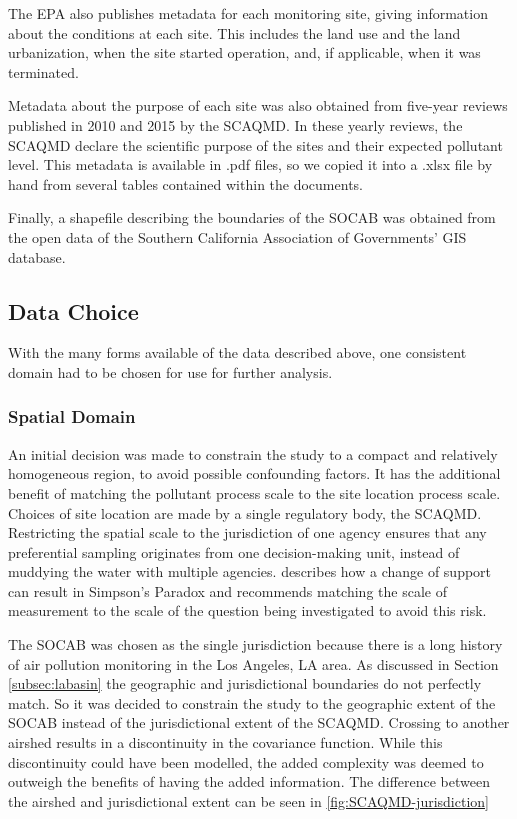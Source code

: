 \documentclass{article}
\begin{document}
The \ac{EPA} also publishes metadata for each monitoring site, giving information about the conditions at each site.  This includes the land use and the land urbanization, when the site started operation, and, if applicable, when it was terminated.

Metadata about the purpose of each site was also obtained from five-year reviews published in 2010 and 2015 by the \ac{SCAQMD}. In these yearly reviews, the \ac{SCAQMD} declare the scientific purpose of the sites and their expected pollutant level. This metadata is available in .pdf files, so we copied it into a .xlsx file by hand from several tables contained within the documents.

Finally, a shapefile describing the boundaries of the \ac{SOCAB} was obtained from the open data of the Southern California Association of Governments' GIS database.




\subsection{Data Choice}\label{subsec:datachoice}
With the many forms available of the data described above, one consistent domain had to be chosen for use for further analysis. 

\subsubsection*{Spatial Domain} \label{subsubsec:SpatialDomain}
An initial decision was made to constrain the study to a compact and relatively homogeneous region, to avoid possible confounding factors. It has the additional benefit of matching the pollutant process scale to the site location process scale.  Choices of site location are made by a single regulatory body, the \ac{SCAQMD}.  Restricting the spatial scale to the jurisdiction of one agency  ensures that any 
preferential sampling originates from one decision-making unit, instead of muddying the water with multiple agencies.   \cite{cressie2011statistics} describes how a change of support can result in Simpson's Paradox and recommends matching the scale of measurement to the scale of the question being investigated to avoid this risk.

The \ac{SOCAB} was chosen as the single jurisdiction because there is a long history of air pollution monitoring in the Los Angeles, LA area.  As discussed in Section \ref{subsec:labasin} the geographic and jurisdictional boundaries do not perfectly match.  So it was decided to constrain the study to the geographic extent of the \ac{SOCAB} instead of the jurisdictional extent of the \ac{SCAQMD}.  Crossing to another airshed results in a discontinuity in the covariance function.  While this discontinuity could have been modelled, the added complexity was deemed to outweigh the benefits of having the added information. The difference between the airshed and jurisdictional extent can be seen in \ref{fig:SCAQMD-jurisdiction}
\end{document}

